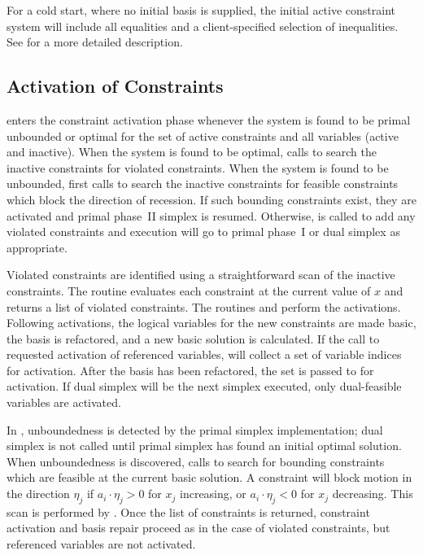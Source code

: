 For a cold start, where no initial basis is supplied,
the initial active constraint system will include all equalities and
a client-specified selection of inequalities.
See  for a more detailed description.

\subsection{Activation of Constraints}
\label{ConstraintActivation}

\dylp enters the constraint activation phase 
whenever the system is found to be primal unbounded or optimal for
the set of active constraints and all variables (active and inactive).
When the system is found to be optimal, \dylp calls
 to search the inactive constraints
for violated constraints.
When the system is found to be unbounded, \dylp first calls
 to search the inactive
constraints for feasible constraints which block the direction of recession.
If such bounding constraints exist, they are activated and
primal phase~II simplex is resumed.
Otherwise,  is called to add any violated
constraints and execution will go to primal phase~I or dual simplex as
appropriate.

Violated constraints are identified using a straightforward scan of
the inactive constraints.
The routine  evaluates each constraint at the
current value of $x$ and returns a list of violated constraints.
The routines  and
 perform the activations.
Following activations, the logical variables for the new constraints are made
basic, the basis is refactored, and a new basic solution is calculated.
If the call to  requested activation of referenced
variables,  will collect a set of variable
indices for activation.
After the basis has been refactored, the set is passed to
 for activation.
If dual simplex will be the next simplex executed, only dual-feasible variables
are activated.

In \dylp, unboundedness is detected by the primal simplex implementation;
dual simplex is not called until primal simplex has found an initial
optimal solution.
When unboundedness is discovered,
\dylp calls  to search for
bounding constraints which are feasible at the current basic solution.
A constraint will block motion in the
direction $\eta_j$ if $a_i \cdot \eta_j > 0$ for
$x_j$ increasing, or $a_i \cdot \eta_j < 0$ for $x_j$ decreasing.
This scan is performed by .
Once the list of constraints is returned, constraint activation and basis
repair proceed as in the case of violated constraints, but referenced variables
are not activated.

